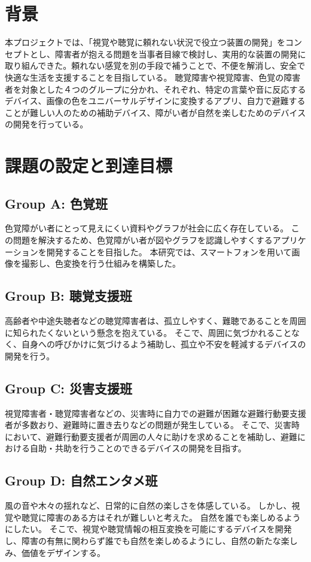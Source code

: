 \section{背景}
本プロジェクトでは、「視覚や聴覚に頼れない状況で役立つ装置の開発」をコンセプトとし、障害者が抱える問題を当事者目線で検討し、実用的な装置の開発に取り組んできた。頼れない感覚を別の手段で補うことで、不便を解消し、安全で快適な生活を支援することを目指している。
聴覚障害や視覚障害、色覚の障害者を対象とした４つのグループに分かれ、それぞれ、特定の言葉や音に反応するデバイス、画像の色をユニバーサルデザインに変換するアプリ、自力で避難することが難しい人のための補助デバイス、障がい者が自然を楽しむためのデバイスの開発を行っている。

\section{課題の設定と到達目標}
\subsection{Group A: 色覚班}
色覚障がい者にとって見えにくい資料やグラフが社会に広く存在している。
この問題を解決するため、色覚障がい者が図やグラフを認識しやすくするアプリケーションを開発することを目指した。
本研究では、スマートフォンを用いて画像を撮影し、色変換を行う仕組みを構築した。

\subsection{Group B: 聴覚支援班}
高齢者や中途失聴者などの聴覚障害者は、孤立しやすく、難聴であることを周囲に知られたくないという懸念を抱えている。
そこで、周囲に気づかれることなく、自身への呼びかけに気づけるよう補助し、孤立や不安を軽減するデバイスの開発を行う。

\subsection{Group C: 災害支援班}
視覚障害者・聴覚障害者などの、災害時に自力での避難が困難な避難行動要支援者が多数おり、避難時に置き去りなどの問題が発生している。
そこで、災害時において、避難行動要支援者が周囲の人々に助けを求めることを補助し、避難における自助・共助を行うことのできるデバイスの開発を目指す。

\subsection{Group D: 自然エンタメ班}
風の音や木々の揺れなど、日常的に自然の楽しさを体感している。
しかし、視覚や聴覚に障害のある方はそれが難しいと考えた。
自然を誰でも楽しめるようにしたい。
そこで、視覚や聴覚情報の相互変換を可能にするデバイスを開発し、障害の有無に関わらず誰でも自然を楽しめるようにし、自然の新たな楽しみ、価値をデザインする。

